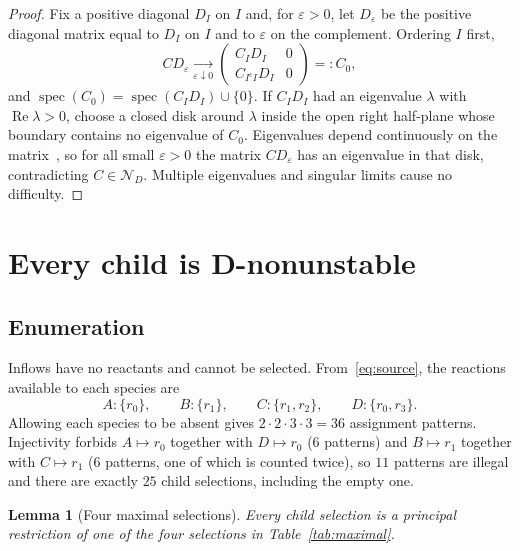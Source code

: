 \documentclass[11pt,a4paper]{article}
\theoremstyle{plain}
\newtheorem{lemma}[theorem]{Lemma}
\theoremstyle{definition}
\theoremstyle{remark}
\newcommand{\Real}{\operatorname{Re}}
\newcommand{\spec}{\operatorname{spec}}
\newcommand{\DN}{\mathcal{N}_D}
\begin{document}
\begin{proof}
Fix a positive diagonal $D_I$ on $I$ and, for $\varepsilon>0$, let $D_\varepsilon$ be the positive diagonal matrix equal to $D_I$ on $I$ and to $\varepsilon$ on the complement. Ordering $I$ first,
\[
CD_\varepsilon\xrightarrow[\varepsilon\downarrow0]{}
\begin{pmatrix}C_ID_I&0\\ C_{I^cI}D_I&0\end{pmatrix}=:C_0 ,
\]
and $\spec(C_0)=\spec(C_ID_I)\cup\{0\}$. If $C_ID_I$ had an eigenvalue $\lambda$ with $\Real\lambda>0$, choose a closed disk around $\lambda$ inside the open right half-plane whose boundary contains no eigenvalue of $C_0$. Eigenvalues depend continuously on the matrix~\cite[App.~D]{HornJohnson2013}, so for all small $\varepsilon>0$ the matrix $CD_\varepsilon$ has an eigenvalue in that disk, contradicting $C\in\DN$. Multiple eigenvalues and singular limits cause no difficulty.
\end{proof}

\section{Every child is D-nonunstable}\label{sec:children}

\subsection{Enumeration}

Inflows have no reactants and cannot be selected. From~\eqref{eq:source}, the reactions available to each species are
\begin{equation}\label{eq:choices}
A\colon\{r_0\},\qquad B\colon\{r_1\},\qquad C\colon\{r_1,r_2\},\qquad D\colon\{r_0,r_3\}.
\end{equation}
Allowing each species to be absent gives $2\cdot2\cdot3\cdot3=36$ assignment patterns. Injectivity forbids $A\mapsto r_0$ together with $D\mapsto r_0$ ($6$ patterns) and $B\mapsto r_1$ together with $C\mapsto r_1$ ($6$ patterns, one of which is counted twice), so $11$ patterns are illegal and there are exactly $25$ child selections, including the empty one.

\begin{lemma}[Four maximal selections]\label{lem:maximal}
Every child selection is a principal restriction of one of the four selections in Table~\ref{tab:maximal}.
\end{lemma}
\end{document}
